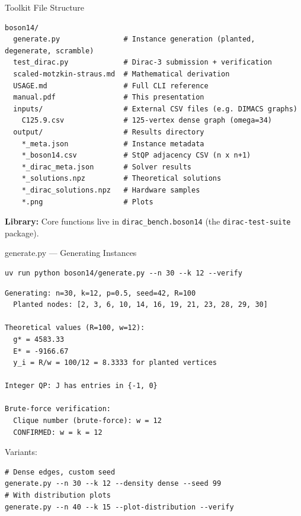 \documentclass[aspectratio=169]{beamer}
\begin{document}
\begin{frame}[fragile]{Toolkit File Structure}
\begin{lstlisting}[style=shell,numbers=none]
boson14/
  generate.py               # Instance generation (planted, degenerate, scramble)
  test_dirac.py             # Dirac-3 submission + verification
  scaled-motzkin-straus.md  # Mathematical derivation
  USAGE.md                  # Full CLI reference
  manual.pdf                # This presentation
  inputs/                   # External CSV files (e.g. DIMACS graphs)
    C125.9.csv              # 125-vertex dense graph (omega=34)
  output/                   # Results directory
    *_meta.json             # Instance metadata
    *_boson14.csv           # StQP adjacency CSV (n x n+1)
    *_dirac_meta.json       # Solver results
    *_solutions.npz         # Theoretical solutions
    *_dirac_solutions.npz   # Hardware samples
    *.png                   # Plots
\end{lstlisting}

    \vspace{0.5em}
    \textbf{Library:} Core functions live in \texttt{dirac\_bench.boson14} (the \texttt{dirac-test-suite} package).
\end{frame}


\begin{frame}[fragile]{generate.py --- Generating Instances}
\begin{lstlisting}[style=shell,numbers=none]
uv run python boson14/generate.py --n 30 --k 12 --verify
\end{lstlisting}

\begin{lstlisting}[numbers=none,basicstyle=\ttfamily\scriptsize]
Generating: n=30, k=12, p=0.5, seed=42, R=100
  Planted nodes: [2, 3, 6, 10, 14, 16, 19, 21, 23, 28, 29, 30]

Theoretical values (R=100, w=12):
  g* = 4583.33
  E* = -9166.67
  y_i = R/w = 100/12 = 8.3333 for planted vertices

Integer QP: J has entries in {-1, 0}

Brute-force verification:
  Clique number (brute-force): w = 12
  CONFIRMED: w = k = 12
\end{lstlisting}

    Variants:
\begin{lstlisting}[style=shell,numbers=none]
# Dense edges, custom seed
generate.py --n 30 --k 12 --density dense --seed 99
# With distribution plots
generate.py --n 40 --k 15 --plot-distribution --verify
\end{lstlisting}
\end{frame}
\end{document}
